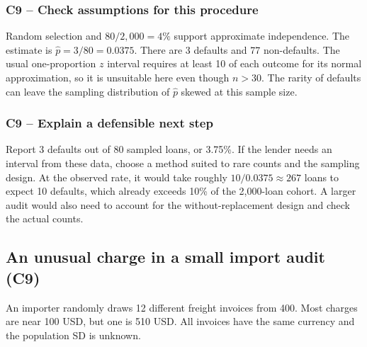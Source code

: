 	\subsubsection*{C9 -- Check assumptions for this procedure}

	Random selection and $80/2{,}000=4\%$ support approximate independence. The estimate is $\hat p=3/80=0.0375$. There are 3 defaults and 77 non-defaults. The usual one-proportion $z$ interval requires at least 10 of each outcome for its normal approximation, so it is unsuitable here even though $n>30$. The rarity of defaults can leave the sampling distribution of $\hat p$ skewed at this sample size.


	\label{sol:c9-2-b}
	\subsubsection*{C9 -- Explain a defensible next step}

	Report 3 defaults out of 80 sampled loans, or 3.75\%. If the lender needs an interval from these data, choose a method suited to rare counts and the sampling design. At the observed rate, it would take roughly $10/0.0375\approx267$ loans to expect 10 defaults, which already exceeds 10\% of the 2,000-loan cohort. A larger audit would also need to account for the without-replacement design and check the actual counts.


	\clearpage

	\subsection{An unusual charge in a small import audit (C9)}
	\label{prob:c9-3}

	An importer randomly draws 12 different freight invoices from 400. Most charges are near 100 USD, but one is 510 USD. All invoices have the same currency and the population SD is unknown.


